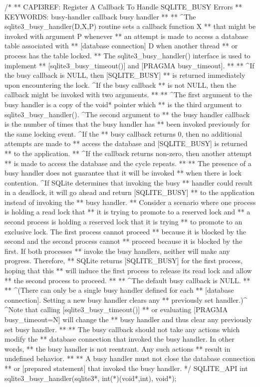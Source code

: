 \begin{Codex}[label=sqlite3.h,numbers=left]
{/*
** CAPI3REF: Register A Callback To Handle SQLITE_BUSY Errors
** KEYWORDS: {busy-handler callback} {busy handler}
**
** ^The sqlite3_busy_handler(D,X,P) routine sets a callback function X
** that might be invoked with argument P whenever
** an attempt is made to access a database table associated with
** [database connection] D when another thread
** or process has the table locked.
** The sqlite3_busy_handler() interface is used to implement
** [sqlite3_busy_timeout()] and [PRAGMA busy_timeout].
**
** ^If the busy callback is NULL, then [SQLITE_BUSY]
** is returned immediately upon encountering the lock.  ^If the busy callback
** is not NULL, then the callback might be invoked with two arguments.
**
** ^The first argument to the busy handler is a copy of the void* pointer which
** is the third argument to sqlite3_busy_handler().  ^The second argument to
** the busy handler callback is the number of times that the busy handler has
** been invoked previously for the same locking event.  ^If the
** busy callback returns 0, then no additional attempts are made to
** access the database and [SQLITE_BUSY] is returned
** to the application.
** ^If the callback returns non-zero, then another attempt
** is made to access the database and the cycle repeats.
**
** The presence of a busy handler does not guarantee that it will be invoked
** when there is lock contention. ^If SQLite determines that invoking the busy
** handler could result in a deadlock, it will go ahead and return [SQLITE_BUSY]
** to the application instead of invoking the 
** busy handler.
** Consider a scenario where one process is holding a read lock that
** it is trying to promote to a reserved lock and
** a second process is holding a reserved lock that it is trying
** to promote to an exclusive lock.  The first process cannot proceed
** because it is blocked by the second and the second process cannot
** proceed because it is blocked by the first.  If both processes
** invoke the busy handlers, neither will make any progress.  Therefore,
** SQLite returns [SQLITE_BUSY] for the first process, hoping that this
** will induce the first process to release its read lock and allow
** the second process to proceed.
**
** ^The default busy callback is NULL.
**
** ^(There can only be a single busy handler defined for each
** [database connection].  Setting a new busy handler clears any
** previously set handler.)^  ^Note that calling [sqlite3_busy_timeout()]
** or evaluating [PRAGMA busy_timeout=N] will change the
** busy handler and thus clear any previously set busy handler.
**
** The busy callback should not take any actions which modify the
** database connection that invoked the busy handler.  In other words,
** the busy handler is not reentrant.  Any such actions
** result in undefined behavior.
** 
** A busy handler must not close the database connection
** or [prepared statement] that invoked the busy handler.
*/
SQLITE_API int sqlite3_busy_handler(sqlite3*, int(*)(void*,int), void*);

}
\end{Codex}
